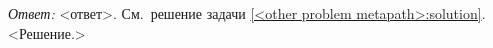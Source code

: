 \problem

\label{<problem metapath>:solution}%
\emph{Ответ:} <ответ>.
\ifsolutiondefined
См.~решение задачи \ref{<other problem metapath>:solution}.
\else
{}
<Решение.>
\fi %

\begingroup %
\ifsolution\def\solutioninclude#1{#1}\else\def\solutioninclude#1{}\fi
\solutioninclude{\ifsolutiondefined\else
\begin{figure}\centering
    \jeolmfigure[width=0.5\textwidth]{solution}
    \caption{к решению задачи \ref{<problem metapath>:solution}}
    \label{<problem metapath>:solution:fig}
\end{figure}%
\fi}%
\endgroup %


